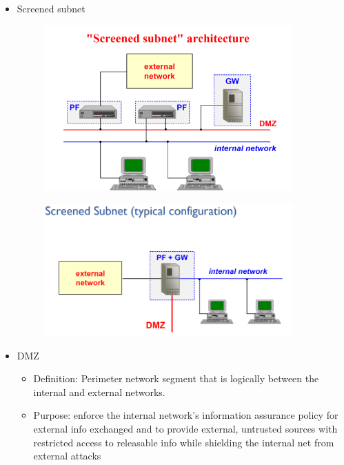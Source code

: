 \documentclass{article}
\begin{document}
\begin{itemize}
\begin{itemize}
\begin{figure}[H]
  \end{figure}
  \item Screened subnet
  \begin{figure}[H]
    \centering
    \includegraphics[width=0.90\textwidth]{figure/screened_subnet.png}
  \end{figure}
  \begin{figure}[H]
    \centering
    \includegraphics[width=0.90\textwidth]{figure/screened_subnet_2.png}
  \end{figure}
  \item DMZ
    \begin{itemize}
      \item Definition: Perimeter network segment that is logically between the internal and external networks.
      \item Purpose: enforce the internal network’s information assurance policy for external info exchanged and to provide external, untrusted sources with restricted access to releasable info while shielding the internal net from external attacks
    \end{itemize}
\end{itemize}
\end{itemize}
\end{document}
